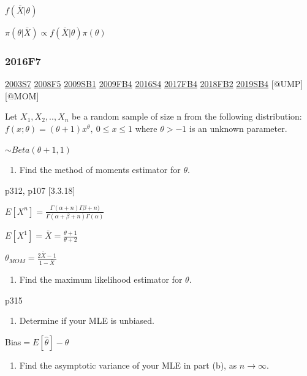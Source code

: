 \documentclass[6pt,twocolumn,Portrait]{article}
\providecommand{\tightlist}{%
  \setlength{\itemsep}{0pt}\setlength{\parskip}{0pt}}
\begin{document}
\(f(\bar X|\theta)\)

\(\pi(\theta|\bar X)\propto f(\bar X|\theta)\pi(\theta)\)

\hypertarget{f7-5}{%
\subsubsection{2016F7}\label{f7-5}}

\protect\hyperlink{s7}{2003S7} \protect\hyperlink{f5-3}{2008F5}
\protect\hyperlink{sb1}{2009SB1} \protect\hyperlink{fb4}{2009FB4}
\protect\hyperlink{s4-4}{2016S4} \protect\hyperlink{fb4-3}{2017FB4}
\protect\hyperlink{fb2-4}{2018FB2} \protect\hyperlink{sb4-2}{2019SB4}
{[}@UMP{]} {[}@MOM{]}

Let \(X_1,X_2,..,X_n\) be a random sample of size n from the following
distribution: \(f(x;\theta)=(\theta+1)x^\theta,\ 0\le x\le 1\) where
\(\theta>-1\) is an unknown parameter.

\(\sim Beta(\theta+1,1)\)

\begin{enumerate}
\def\labelenumi{(\alph{enumi})}
\tightlist
\item
  Find the method of moments estimator for \(\theta\).
\end{enumerate}

p312, p107 {[}3.3.18{]}

\(E[X^n]=\frac{\Gamma(\alpha+n)\Gamma\beta+n)}{\Gamma(\alpha+\beta+n)\Gamma(\alpha)}\)

\(E[X^1]=\bar X=\frac{\theta+1}{\theta+2}\)

\(\theta_{MOM}=\frac{2\bar X-1}{1-\bar X}\)

\begin{enumerate}
\def\labelenumi{(\alph{enumi})}
\setcounter{enumi}{1}
\tightlist
\item
  Find the maximum likelihood estimator for \(\theta\).
\end{enumerate}

p315

\begin{enumerate}
\def\labelenumi{(\alph{enumi})}
\setcounter{enumi}{2}
\tightlist
\item
  Determine if your MLE is unbiased.
\end{enumerate}

Bias\(=E[\hat\theta]-\theta\)

\begin{enumerate}
\def\labelenumi{(\alph{enumi})}
\setcounter{enumi}{3}
\tightlist
\item
  Find the asymptotic variance of your MLE in part (b), as
  \(n\to\infty\).
\end{enumerate}
\end{document}
